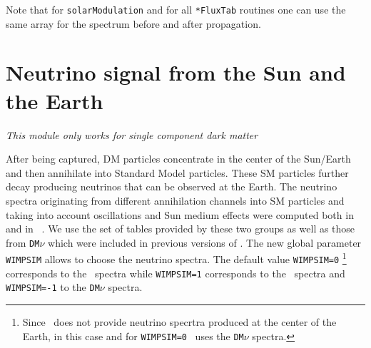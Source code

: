\documentclass[12pt,a4paper]{article}
\begin{document}
Note that for \verb|solarModulation| and for  all \verb|*FluxTab| 
routines one can use  the same array for the spectrum before and after propagation. 




\section{Neutrino signal from the Sun and the Earth }
\label{sec:neutrino}

\begin{center}
{\it This module only works for single component dark matter}
\end{center}

After being captured, DM particles concentrate in the center of the Sun/Earth and 
then  annihilate into Standard Model particles. These SM particles further decay producing neutrinos that can be 
observed at the Earth.  The neutrino spectra originating from
different annihilation channels into SM particles and
taking into account oscillations  and Sun medium effects were 
computed both in
\wimpsim~\cite{Blennow:2007tw} and in 
\pppc~\cite{Baratella:2013fya}. We use the set of tables
provided by these two groups as well as  those from  {\tt DM$\nu$}
\cite{Cirelli:2005gh}  which were included in previous versions of \micro.
The new global parameter {\tt WIMPSIM}  allows to
choose  the   neutrino spectra. The default value  {\tt WIMPSIM=0} \footnote{Since \pppc\ does not provide neutrino specrtra produced at the center of the
Earth, in this case  and for {\tt WIMPSIM=0} \micro\ uses the {\tt DM$\nu$} spectra.}
corresponds to the \pppc\ spectra while  {\tt WIMPSIM=1} corresponds to the
\wimpsim\  spectra and  {\tt WIMPSIM=-1}  to the 
 {\tt DM$\nu$} spectra. 
  
\end{document}
